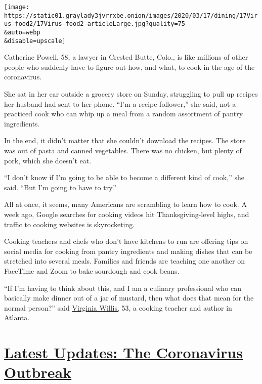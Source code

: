 \texttt{[image: https://static01.graylady3jvrrxbe.onion/images/2020/03/17/dining/17Virus-food2/17Virus-food2-articleLarge.jpg?quality=75\\\&auto=webp\\\&disable=upscale]}

Catherine Powell, 58, a lawyer in Crested Butte, Colo., is like millions
of other people who suddenly have to figure out how, and what, to cook
in the age of the coronavirus.

She sat in her car outside a grocery store on Sunday, struggling to pull
up recipes her husband had sent to her phone. ``I'm a recipe follower,''
she said, not a practiced cook who can whip up a meal from a random
assortment of pantry ingredients.

In the end, it didn't matter that she couldn't download the recipes. The
store was out of pasta and canned vegetables. There was no chicken, but
plenty of pork, which she doesn't eat.

``I don't know if I'm going to be able to become a different kind of
cook,'' she said. ``But I'm going to have to try.''

All at once, it seems, many Americans are scrambling to learn how to
cook. A week ago, Google searches for cooking videos hit
Thanksgiving-level highs, and traffic to cooking websites is
skyrocketing.

Cooking teachers and chefs who don't have kitchens to run are offering
tips on social media for cooking from pantry ingredients and making
dishes that can be stretched into several meals. Families and friends
are teaching one another on FaceTime and Zoom to bake sourdough and cook
beans.

``If I'm having to think about this, and I am a culinary professional
who can basically make dinner out of a jar of mustard, then what does
that mean for the normal person?'' said
\href{https://www.nytimes3xbfgragh.onion/2018/08/07/dining/is-it-southern-food-or-soul-food.html}{Virginia
Willis,} 53, a cooking teacher and author in Atlanta.

\hypertarget{latest-updates-the-coronavirus-outbreak}{%
\section{\texorpdfstring{\href{https://www.nytimes3xbfgragh.onion/2020/08/21/world/covid-19-coronavirus.html?action=click\&pgtype=Article\&state=default\&region=MAIN_CONTENT_1\&context=storylines_live_updates}{Latest
Updates: The Coronavirus
Outbreak}}{Latest Updates: The Coronavirus Outbreak}}\label{latest-updates-the-coronavirus-outbreak}}

